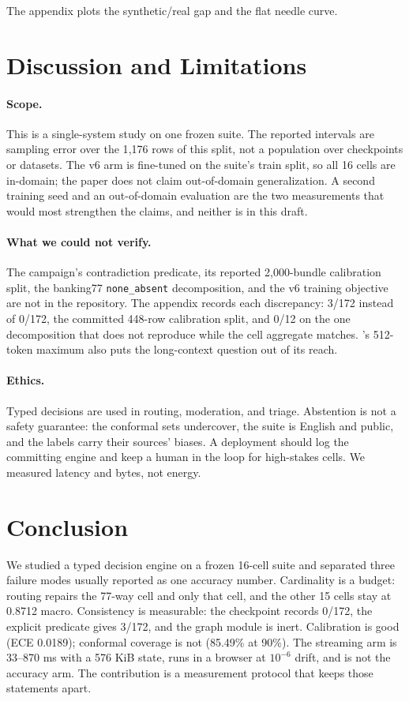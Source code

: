 The appendix plots the synthetic/real gap and the flat needle curve.

\section{Discussion and Limitations}
\label{sec:limitations}

\paragraph{Scope.}
This is a single-system study on one frozen suite. The reported intervals are sampling error over the 1{,}176 rows of this split, not a population over checkpoints or datasets. The v6 arm is fine-tuned on the suite's train split, so all 16 cells are in-domain; the paper does not claim out-of-domain generalization. A second training seed and an out-of-domain evaluation are the two measurements that would most strengthen the claims, and neither is in this draft.

\paragraph{What we could not verify.}
The campaign's contradiction predicate, its reported 2{,}000-bundle calibration split, the banking77 \texttt{none\_absent} decomposition, and the v6 training objective are not in the repository. The appendix records each discrepancy: 3/172 instead of 0/172, the committed 448-row calibration split, and 0/12 on the one decomposition that does not reproduce while the cell aggregate matches. \vsix{}'s 512-token maximum also puts the long-context question out of its reach.

\paragraph{Ethics.}
Typed decisions are used in routing, moderation, and triage. Abstention is not a safety guarantee: the conformal sets undercover, the suite is English and public, and the labels carry their sources' biases. A deployment should log the committing engine and keep a human in the loop for high-stakes cells. We measured latency and bytes, not energy.

\section{Conclusion}
\label{sec:conclusion}

We studied a typed decision engine on a frozen 16-cell suite and separated three failure modes usually reported as one accuracy number. Cardinality is a budget: routing repairs the 77-way cell and only that cell, and the other 15 cells stay at 0.8712 macro. Consistency is measurable: the checkpoint records 0/172, the explicit predicate gives 3/172, and the graph module is inert. Calibration is good (ECE 0.0189); conformal coverage is not (85.49\% at 90\%). The streaming arm is 33--870 ms with a 576 KiB state, runs in a browser at $10^{-6}$ drift, and is not the accuracy arm. The contribution is a measurement protocol that keeps those statements apart.
